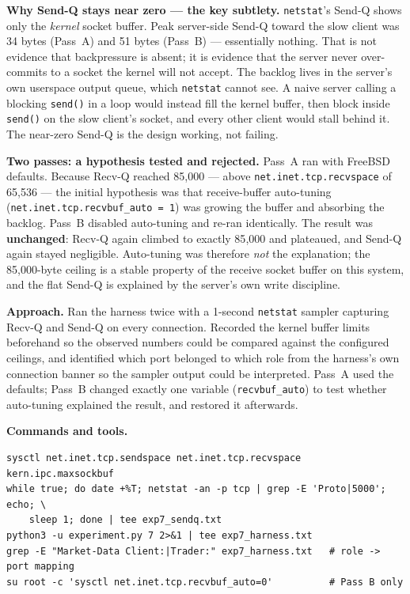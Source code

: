 \documentclass[11pt,a4paper]{article}
\newcommand{\cmd}[1]{\texttt{\small #1}}
\begin{document}
\textbf{Why Send-Q stays near zero --- the key subtlety.} \cmd{netstat}'s Send-Q
shows only the \emph{kernel} socket buffer. Peak server-side Send-Q toward the
slow client was 34 bytes (Pass~A) and 51 bytes (Pass~B) --- essentially nothing.
That is not evidence that backpressure is absent; it is evidence that the server
never over-commits to a socket the kernel will not accept. The backlog lives in
the server's own userspace output queue, which \cmd{netstat} cannot see. A naive
server calling a blocking \cmd{send()} in a loop would instead fill the kernel
buffer, then block inside \cmd{send()} on the slow client's socket, and every
other client would stall behind it. The near-zero Send-Q is the design working,
not failing.

\textbf{Two passes: a hypothesis tested and rejected.} Pass~A ran with FreeBSD
defaults. Because Recv-Q reached 85{,}000 --- above \cmd{net.inet.tcp.recvspace}
of 65{,}536 --- the initial hypothesis was that receive-buffer auto-tuning
(\cmd{net.inet.tcp.recvbuf\_auto = 1}) was growing the buffer and absorbing the
backlog. Pass~B disabled auto-tuning and re-ran identically. The result was
\textbf{unchanged}: Recv-Q again climbed to exactly 85{,}000 and plateaued, and
Send-Q again stayed negligible. Auto-tuning was therefore \emph{not} the
explanation; the 85{,}000-byte ceiling is a stable property of the receive
socket buffer on this system, and the flat Send-Q is explained by the server's
own write discipline.

\textbf{Approach.} Ran the harness twice with a 1-second \cmd{netstat}
sampler capturing Recv-Q and Send-Q on every connection. Recorded the kernel
buffer limits beforehand so the observed numbers could be compared against the
configured ceilings, and identified which port belonged to which role from the
harness's own connection banner so the sampler output could be interpreted.
Pass~A used the defaults; Pass~B changed exactly one variable
(\cmd{recvbuf\_auto}) to test whether auto-tuning explained the result, and
restored it afterwards.

\textbf{Commands and tools.}
\begin{Verbatim}[fontsize=\small,frame=single]
sysctl net.inet.tcp.sendspace net.inet.tcp.recvspace kern.ipc.maxsockbuf
while true; do date +%T; netstat -an -p tcp | grep -E 'Proto|5000'; echo; \
    sleep 1; done | tee exp7_sendq.txt
python3 -u experiment.py 7 2>&1 | tee exp7_harness.txt
grep -E "Market-Data Client:|Trader:" exp7_harness.txt   # role -> port mapping
su root -c 'sysctl net.inet.tcp.recvbuf_auto=0'          # Pass B only
\end{Verbatim}
\end{document}
